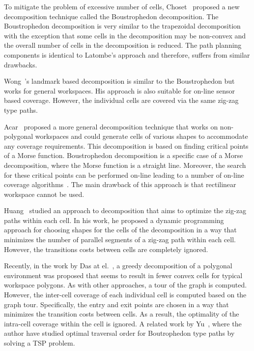 \documentclass[../main.tex]{subfiles}
\begin{document}
To mitigate the problem of excessive number of cells, Choset~\cite{choset2000coverage} proposed a new decomposition technique called the Boustrophedon decomposition. The Boustrophedon decomposition is very similar to the trapezoidal decomposition with the exception that some cells in the decomposition may be non-convex and the overall number of cells in the decomposition is reduced. The path planning components is identical to Latombe's approach and therefore, suffers from similar drawbacks.

Wong~\cite{wong2004complete}'s landmark based decomposition is similar to the Boustrophedon but works for general workspaces. His approach is also suitable for on-line sensor based coverage. However, the individual cells are covered via the same zig-zag type paths.

Acar~\cite{Acar2002morse} proposed a more general decomposition technique that works on non-polygonal workspaces and could generate cells of various shapes to accommodate any coverage requirements. This decomposition is based on finding critical points of a Morse function. Boustrophedon decomposition is a specific case of a Morse decomposition, where the Morse function is a straight line. Moreover, the search for these critical points can be performed on-line leading to a number of on-line coverage algorithms~\cite{acar2002sensor}. The main drawback of this approach is that rectilinear workspace cannot be used. 

Huang~\cite{Huang2001optimal} studied an approach to decomposition that aims to optimize the zig-zag paths within each cell. In his work, he proposed a dynamic programming approach for choosing shapes for the cells of the decomposition in a way that minimizes the number of parallel segments of a zig-zag path within each cell. However, the transitions costs between cells are completely ignored.

Recently, in the work by Das at el.~\cite{das2014mapping}, a greedy decomposition of a polygonal environment was proposed that seems to result in fewer convex cells for typical workspace polygons. As with other approaches, a tour of the graph is computed. However, the inter-cell coverage of each individual cell is computed based on the graph tour. Specifically, the entry and exit points are chosen in a way that minimizes the transition costs between cells. As a result, the optimality of the intra-cell coverage within the cell is ignored. A related work by Yu~\cite{yu2015optimization}, where the author have studied optimal traversal order for Boutrophedon type paths by solving a TSP problem.
\end{document}

